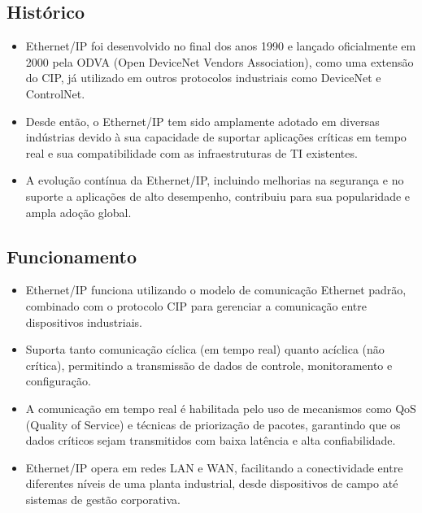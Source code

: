 \documentclass[a4paper,11pt]{article} %
\begin{document}
\subsection{Histórico}
\begin{itemize}
    \item Ethernet/IP foi desenvolvido no final dos anos 1990 e lançado oficialmente em 2000 pela ODVA (Open DeviceNet Vendors Association), como uma extensão do CIP, já utilizado em outros protocolos industriais como DeviceNet e ControlNet.
    \item Desde então, o Ethernet/IP tem sido amplamente adotado em diversas indústrias devido à sua capacidade de suportar aplicações críticas em tempo real e sua compatibilidade com as infraestruturas de TI existentes.
    \item A evolução contínua da Ethernet/IP, incluindo melhorias na segurança e no suporte a aplicações de alto desempenho, contribuiu para sua popularidade e ampla adoção global.
\end{itemize}

\subsection{Funcionamento}
\begin{itemize}
    \item Ethernet/IP funciona utilizando o modelo de comunicação Ethernet padrão, combinado com o protocolo CIP para gerenciar a comunicação entre dispositivos industriais.
    \item Suporta tanto comunicação cíclica (em tempo real) quanto acíclica (não crítica), permitindo a transmissão de dados de controle, monitoramento e configuração.
    \item A comunicação em tempo real é habilitada pelo uso de mecanismos como QoS (Quality of Service) e técnicas de priorização de pacotes, garantindo que os dados críticos sejam transmitidos com baixa latência e alta confiabilidade.
    \item Ethernet/IP opera em redes LAN e WAN, facilitando a conectividade entre diferentes níveis de uma planta industrial, desde dispositivos de campo até sistemas de gestão corporativa.
\end{itemize}
\end{document}
